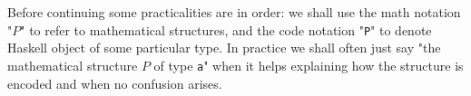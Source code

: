 Before continuing some practicalities are in order: we shall use the math notation "$P$" to refer to mathematical structures, and the code notation "\texttt{P}" to denote Haskell object of some particular type. In practice we shall often just say "the mathematical structure $P$ of type \texttt{a}" when it helps explaining how the structure is encoded and when no confusion arises.              




%